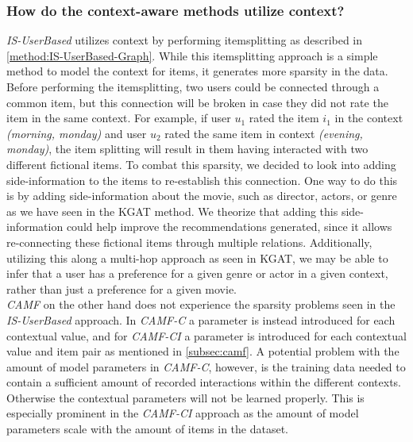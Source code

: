 \subsubsection{How do the context-aware methods utilize context?} %
\textit{IS-UserBased} utilizes context by performing itemsplitting as described in \autoref{method:IS-UserBased-Graph}.
While this itemsplitting approach is a simple method to model the context for items, it generates more sparsity in the data.
Before performing the itemsplitting, two users could be connected through a common item, but this connection will be broken in case they did not rate the item in the same context.
For example, if user $u_1$ rated the item $i_1$ in the context \textit{(morning, monday)} and user $u_2$ rated the same item in context \textit{(evening, monday)}, the item splitting will result in them having interacted with two different fictional items.
To combat this sparsity, we decided to look into adding side-information to the items to re-establish this connection.
One way to do this is by adding side-information about the movie, such as director, actors, or genre as we have seen in the KGAT method.
We theorize that adding this side-information could help improve the recommendations generated, since it allows re-connecting these fictional items through multiple relations.
Additionally, utilizing this along a multi-hop approach as seen in KGAT, we may be able to infer that a user has a preference for a given genre or actor in a given context, rather than just a preference for a given movie.\\


\textit{CAMF} on the other hand does not experience the sparsity problems seen in the \textit{IS-UserBased} approach.
In \textit{CAMF-C} a parameter is instead introduced for each contextual value, and for \textit{CAMF-CI} a parameter is introduced for each contextual value and item pair as mentioned in \autoref{subsec:camf}.
A potential problem with the amount of model parameters in \textit{CAMF-C}, however, is the training data needed to contain a sufficient amount of recorded interactions within the different contexts. 
Otherwise the contextual parameters will not be learned properly.
This is especially prominent in the \textit{CAMF-CI} approach as the amount of model parameters scale with the amount of items in the dataset.


